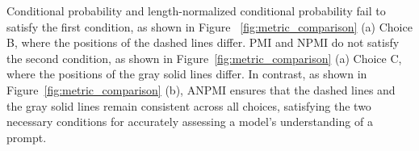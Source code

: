 {Conditional probability and length-normalized conditional probability fail to satisfy the first condition, as shown in Figure \hbox{~\ref{fig:metric_comparison}} (a) Choice B, where the positions of the dashed lines differ. PMI and NPMI do not satisfy the second condition, as shown in Figure\hbox{~\ref{fig:metric_comparison}} (a) Choice C, where the positions of the gray solid lines differ. In contrast, as shown in Figure\hbox{~\ref{fig:metric_comparison}} (b), ANPMI ensures that the dashed lines and the gray solid lines remain consistent across all choices, satisfying the two necessary conditions for accurately assessing a model's understanding of a prompt.}








